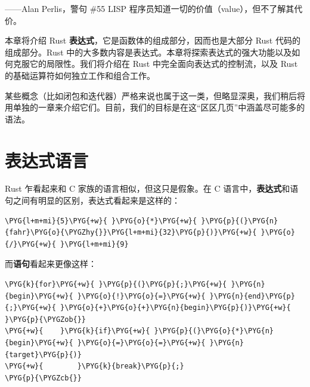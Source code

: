 
\begin{myEpigraph}{——Alan Perlis，警句 \#55}
LISP 程序员知道一切的价值（value），但不了解其代价。
\end{myEpigraph}

本章将介绍 Rust \textbf{表达式}，它是函数体的组成部分，因而也是大部分 Rust 代码的组成部分。Rust 中的大多数内容是表达式。本章将探索表达式的强大功能以及如何克服它的局限性。我们将介绍在 Rust 中完全面向表达式的控制流，以及 Rust 的基础运算符如何独立工作和组合工作。

某些概念（比如闭包和迭代器）严格来说也属于这一类，但略显深奥，我们稍后将用单独的一章来介绍它们。目前，我们的目标是在这“区区几页”中涵盖尽可能多的语法。

\section{表达式语言}

Rust 乍看起来和 C 家族的语言相似，但这只是假象。在 C 语言中，\textbf{表达式}和语句之间有明显的区别，表达式看起来是这样的：

\begin{Verbatim}[commandchars=\\\{\},breaklines=true,breakanywhere=true,fontsize=\codefont,xleftmargin=17bp]
\PYG{l+m+mi}{5}\PYG{+w}{ }\PYG{o}{*}\PYG{+w}{ }\PYG{p}{(}\PYG{n}{fahr}\PYG{o}{\PYGZhy{}}\PYG{l+m+mi}{32}\PYG{p}{)}\PYG{+w}{ }\PYG{o}{/}\PYG{+w}{ }\PYG{l+m+mi}{9}
\end{Verbatim}

而\textbf{语句}看起来更像这样：

\begin{Verbatim}[commandchars=\\\{\},breaklines=true,breakanywhere=true,fontsize=\codefont,xleftmargin=17bp]
\PYG{k}{for}\PYG{+w}{ }\PYG{p}{(}\PYG{p}{;}\PYG{+w}{ }\PYG{n}{begin}\PYG{+w}{ }\PYG{o}{!}\PYG{o}{=}\PYG{+w}{ }\PYG{n}{end}\PYG{p}{;}\PYG{+w}{ }\PYG{o}{+}\PYG{o}{+}\PYG{n}{begin}\PYG{p}{)}\PYG{+w}{ }\PYG{p}{\PYGZob{}}
\PYG{+w}{    }\PYG{k}{if}\PYG{+w}{ }\PYG{p}{(}\PYG{o}{*}\PYG{n}{begin}\PYG{+w}{ }\PYG{o}{=}\PYG{o}{=}\PYG{+w}{ }\PYG{n}{target}\PYG{p}{)}
\PYG{+w}{        }\PYG{k}{break}\PYG{p}{;}
\PYG{p}{\PYGZcb{}}
\end{Verbatim}

